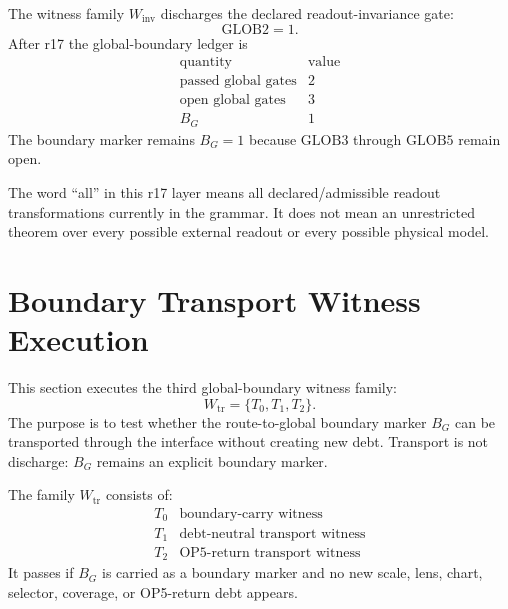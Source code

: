 \begin{theorem}
The witness family \(W_{\mathrm{inv}}\) discharges the declared
readout-invariance gate:
\[
    \mathrm{GLOB2}=1.
\]
After r17 the global-boundary ledger is
\[
\begin{array}{c|r}
\text{quantity} & \text{value}\\
\hline
\text{passed global gates} & 2\\
\text{open global gates} & 3\\
B_G & 1
\end{array}
\]
The boundary marker remains \(B_G=1\) because \(\mathrm{GLOB3}\) through
\(\mathrm{GLOB5}\) remain open.
\end{theorem}

\begin{remark}
The word ``all'' in this r17 layer means all declared/admissible readout
transformations currently in the grammar.  It does not mean an unrestricted
theorem over every possible external readout or every possible physical model.
\end{remark}



\section{Boundary Transport Witness Execution}
\label{sec:v450-r18-execute-wtr-boundary-transport}

This section executes the third global-boundary witness family:
\[
    W_{\mathrm{tr}}=\{T_0,T_1,T_2\}.
\]
The purpose is to test whether the route-to-global boundary marker \(B_G\) can
be transported through the interface without creating new debt.  Transport is
not discharge: \(B_G\) remains an explicit boundary marker.

\begin{definition}
The family \(W_{\mathrm{tr}}\) consists of:
\[
\begin{array}{c|l}
T_0 & \text{boundary-carry witness}\\
T_1 & \text{debt-neutral transport witness}\\
T_2 & \text{OP5-return transport witness}
\end{array}
\]
It passes if \(B_G\) is carried as a boundary marker and no new scale, lens,
chart, selector, coverage, or OP5-return debt appears.
\end{definition}

